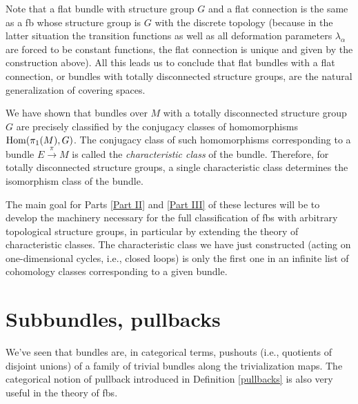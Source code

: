 \begin{example}
	Note that a flat bundle with structure group $G$ and a flat connection is the same as a \gls{fb} whose structure group is $G$ with the discrete topology (because in the latter situation the transition functions as well as all deformation parameters $\lambda_\alpha$ are forced to be constant functions, the flat connection is unique and given by the construction above). All this leads us to conclude that flat bundles with a flat connection, or bundles with totally disconnected structure groups, are the natural generalization of covering spaces.
	
	We have shown that bundles over $M$ with a totally disconnected structure group $G$ are precisely classified by the conjugacy classes of homomorphisms $\operatorname{Hom}(\pi_1(M),G)$. The conjugacy class of such homomorphisms corresponding to a bundle $E\overset{\pi}{\to}M$ is called the \emph{characteristic class} of the bundle. Therefore, for totally disconnected structure groups, a single characteristic class determines the isomorphism class of the bundle.
	
	The main goal for Parts \ref{Part II} and \ref{Part III} of these lectures will be to develop the machinery necessary for the full classification of \glspl{fb} with arbitrary topological structure groups, in particular by extending the theory of characteristic classes. The characteristic class we have just constructed (acting on one-dimensional cycles, i.e., closed loops) is only the first one in an infinite list of cohomology classes corresponding to a given bundle.
\end{example}





\section{Subbundles, pullbacks}


We've seen that bundles are, in categorical terms, pushouts (i.e., quotients of disjoint unions) of a family of trivial bundles along the trivialization maps. The categorical notion of pullback introduced in Definition \ref{pullbacks} is also very useful in the theory of \glspl{fb}.


